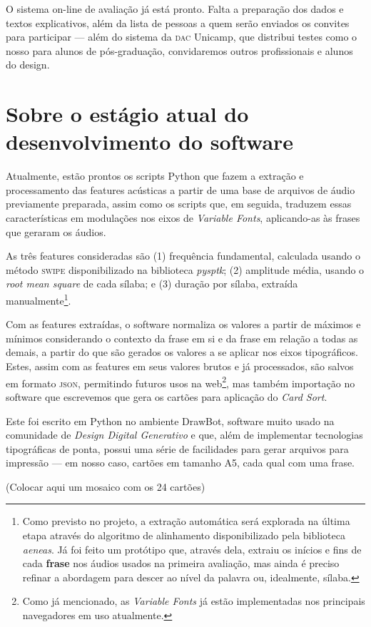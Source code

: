 \documentclass[a4paper,11pt,titlepage,singlespacing]{article}
\begin{document}
{    O sistema on-line de avaliação já está pronto. Falta a preparação dos dados e textos explicativos, além da lista de pessoas a quem serão enviados os convites para participar — além do sistema da \textsc{dac} Unicamp, que distribui testes como o nosso para alunos de pós-graduação, convidaremos outros profissionais e alunos do design.



    \section{Sobre o estágio atual do desenvolvimento do software}
    
    Atualmente, estão prontos os scripts Python que fazem a extração e processamento das features acústicas a partir de uma base de arquivos de áudio previamente preparada, assim como os scripts que, em seguida, traduzem essas características em modulações nos eixos de \textit{Variable Fonts}, aplicando-as às frases que geraram os áudios.
    
    As três features consideradas são (1) frequência fundamental, calculada usando o método \textsc{swipe} disponibilizado na biblioteca \textit{pysptk}; (2) amplitude média, usando o \textit{root mean square} de cada sílaba; e (3) duração por sílaba, extraída manualmente\footnote{Como previsto no projeto, a extração automática será explorada na última etapa através do algoritmo de alinhamento disponibilizado pela biblioteca \textit{aeneas}. Já foi feito um protótipo que, através dela, extraiu os inícios e fins de cada \textbf{frase} nos áudios usados na primeira avaliação, mas ainda é preciso refinar a abordagem para descer ao nível da palavra ou, idealmente, sílaba.}.
    
    Com as features extraídas, o software normaliza os valores a partir de máximos e mínimos considerando o contexto da frase em si e da frase em relação a todas as demais, a partir do que são gerados os valores a se aplicar nos eixos tipográficos. Estes, assim com as features em seus valores brutos e já processados, são salvos em formato \textsc{json}, permitindo futuros usos na web\footnote{Como já mencionado, as \textit{Variable Fonts} já estão implementadas nos principais navegadores em uso atualmente.}, mas também importação no software que escrevemos que gera os cartões para aplicação do \textit{Card Sort}.
    
    Este foi escrito em Python no ambiente DrawBot, software muito usado na comunidade de \textit{Design Digital Generativo} e que, além de implementar tecnologias tipográficas de ponta, possui uma série de facilidades para gerar arquivos para impressão — em nosso caso, cartões em tamanho A5, cada qual com uma frase.
    
    (Colocar aqui um mosaico com os 24 cartões)
    
}




\pagebreak


\end{document}
